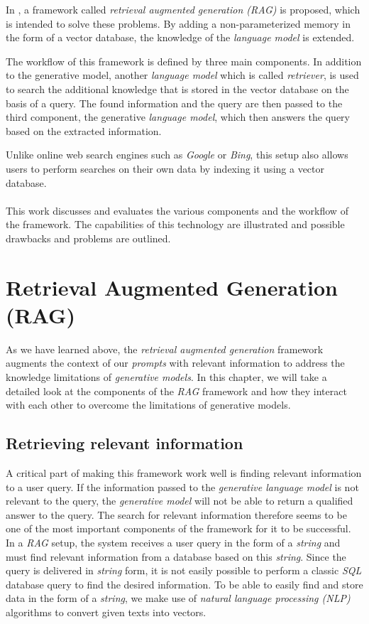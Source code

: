 \documentclass{article}
\begin{document}
In \cite{RAG}, a framework called \textit{retrieval augmented generation (RAG)} is proposed, which is intended to solve these problems. By adding a non-parameterized memory in the form of a vector database, the knowledge of the \textit{language model} is extended. 

The workflow of this framework is defined by three main components. In addition to the generative model, another \textit{language model} which is called \textit{retriever}, is used to search the additional knowledge that is stored in the vector database on the basis of a query. The found information and the query are then passed to the third component, the generative \textit{language model}, which then answers the query based on the extracted information.

Unlike online web search engines such as \textit{Google} or \textit{Bing}, this setup also allows users to perform searches on their own data by indexing it using a vector database. 
\\
\\
This work discusses and evaluates the various components and the workflow of the framework. The capabilities of this technology are illustrated and possible drawbacks and problems are outlined.

\section{Retrieval Augmented Generation (RAG)}
As we have learned above, the \textit{retrieval augmented generation} framework augments the context of our \textit{prompts} with relevant information to address the knowledge limitations of \textit{generative models}.
In this chapter, we will take a detailed look at the components of the \textit{RAG} framework and how they interact with each other to overcome the limitations of generative models.

\subsection{Retrieving relevant information}
A critical part of making this framework work well is finding relevant information to a user query. If the information passed to the \textit{generative language model} is not relevant to the query, the \textit{generative model} will not be able to return a qualified answer to the query. The search for relevant information therefore seems to be one of the most important components of the framework for it to be successful. In a \textit{RAG} setup, the system receives a user query in the form of a \textit{string} and must find relevant information from a database based on this \textit{string}. Since the query is delivered in \textit{string} form, it is not easily possible to perform a classic \textit{SQL} database query to find the desired information. To be able to easily find and store data in the form of a \textit{string}, we make use of \textit{natural language processing (NLP)} algorithms to convert given texts into vectors.
\end{document}
